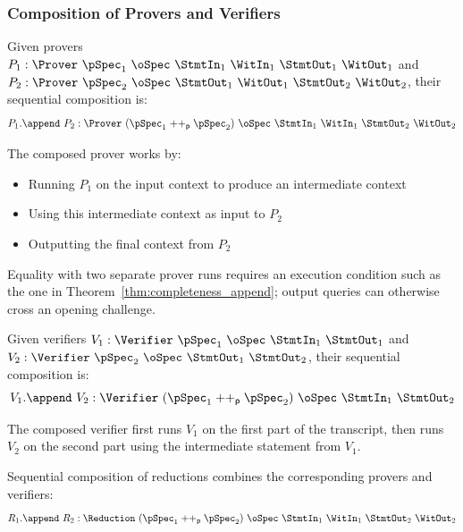 \subsubsection{Composition of Provers and Verifiers}

\begin{definition}
    \label{def:prover_append}
    Given provers $P_1 : \Prover\ \pSpec_1\ \oSpec\ \StmtIn_1\ \WitIn_1\ \StmtOut_1\ \WitOut_1$ and $P_2 : \Prover\ \pSpec_2\ \oSpec\ \StmtOut_1\ \WitOut_1\ \StmtOut_2\ \WitOut_2$, their sequential composition is:
    \[ P_1.\append\ P_2 : \Prover\ (\pSpec_1 \mathrel{++_\mathsf{p}} \pSpec_2)\ \oSpec\ \StmtIn_1\ \WitIn_1\ \StmtOut_2\ \WitOut_2 \]

    The composed prover works by:
    \begin{itemize}
        \item Running $P_1$ on the input context to produce an intermediate context
        \item Using this intermediate context as input to $P_2$
        \item Outputting the final context from $P_2$
    \end{itemize}
    Equality with two separate prover runs requires an execution condition such as the one in
    Theorem~\ref{thm:completeness_append}; output queries can otherwise cross an opening challenge.
    \leanok
\end{definition}

\begin{definition}
    \label{def:verifier_append}
    Given verifiers $V_1 : \Verifier\ \pSpec_1\ \oSpec\ \StmtIn_1\ \StmtOut_1$ and $V_2 : \Verifier\ \pSpec_2\ \oSpec\ \StmtOut_1\ \StmtOut_2$, their sequential composition is:
    \[ V_1.\append\ V_2 : \Verifier\ (\pSpec_1 \mathrel{++_\mathsf{p}} \pSpec_2)\ \oSpec\ \StmtIn_1\ \StmtOut_2 \]

    The composed verifier first runs $V_1$ on the first part of the transcript, then runs $V_2$ on the second part using the intermediate statement from $V_1$.
    \leanok
\end{definition}

\begin{definition}
    \label{def:reduction_append}
    Sequential composition of reductions combines the corresponding provers and verifiers:
    \[ R_1.\append\ R_2 : \Reduction\ (\pSpec_1 \mathrel{++_\mathsf{p}} \pSpec_2)\ \oSpec\ \StmtIn_1\ \WitIn_1\ \StmtOut_2\ \WitOut_2 \]
    \leanok
\end{definition}


